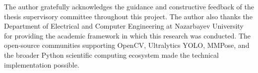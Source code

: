 
The author gratefully acknowledges the guidance and constructive feedback of the thesis supervisory committee throughout this project. The author also thanks the Department of Electrical and Computer Engineering at Nazarbayev University for providing the academic framework in which this research was conducted. The open-source communities supporting OpenCV, Ultralytics YOLO, MMPose, and the broader Python scientific computing ecosystem made the technical implementation possible.
